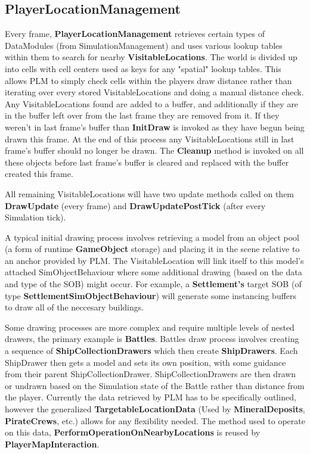 \documentclass{report}
\begin{document}
\subsection{PlayerLocationManagement}

Every frame, \textbf{PlayerLocationManagement} retrieves certain types of DataModules (from SimulationManagement) and uses various lookup tables within them to search for nearby \textbf{VisitableLocations}. The world is divided up into cells with cell centers used as keys for any "spatial" lookup tables. This allows PLM to simply check cells within the players  draw distance rather than iterating over every stored VisitableLocations and doing a manual distance check. Any VisitableLocations found are added to a buffer, and additionally if they are in the buffer left over from the last frame they are removed from it. If they weren't in last frame's buffer than \textbf{InitDraw} is invoked as they have begun being drawn this frame.
At the end of this process any VisitableLocations still in last frame's buffer should no longer be drawn. The \textbf{Cleanup} method is invoked on all these objects before last frame's buffer is cleared and replaced with the buffer created this frame. 

All remaining VisitableLocations will have two update methods called on them \textbf{DrawUpdate} (every frame) and \textbf{DrawUpdatePostTick} (after every Simulation tick).

A typical initial drawing process involves retrieving a model from an object pool (a form of runtime \textbf{GameObject} storage) and placing it in the scene relative to an anchor provided by PLM. The VisitableLocation will link itself to this model's attached SimObjectBehaviour where some additional drawing (based on the data and type of the SOB) might occur. For example, a \textbf{Settlement's} target SOB (of type \textbf{SettlementSimObjectBehaviour}) will generate some instancing buffers to draw all of the neccesary buildings.

Some drawing processes are more complex and require multiple levels of nested drawers, the primary example is \textbf{Battles}. Battles draw process involves creating a sequence of \textbf{ShipCollectionDrawers} which then create \textbf{ShipDrawers}. Each ShipDrawer then gets a model and sets its own position, with some guidance from their parent ShipCollectionDrawer. ShipCollectionDrawers are then drawn or undrawn based on the Simulation state of the Battle rather than distance from the player.
\newline
\newline
Currently the data retrieved by PLM has to be specifically outlined, however the generalized \textbf{TargetableLocationData} (Used by \textbf{MineralDeposits}, \textbf{PirateCrews}, etc.) allows for any flexibility needed. The method used to operate on this data, \textbf{PerformOperationOnNearbyLocations} is reused by \textbf{PlayerMapInteraction}.
\end{document}
